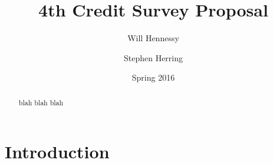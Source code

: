 \documentclass[12pt]{article}
\title{4th Credit Survey Proposal}
\author{Will Hennessy \and Stephen Herring}
\date{Spring 2016}
\begin{document}
\maketitle

\begin{abstract}
blah blah blah
\end{abstract}

\section{Introduction}


%



\end{document}
